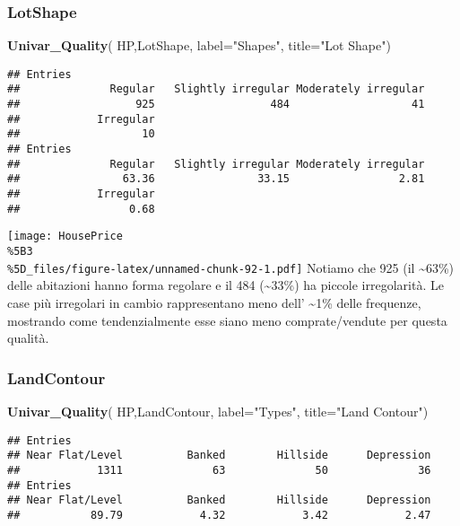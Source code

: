 \documentclass[
]{article}
\newenvironment{Shaded}{\begin{snugshade}}{\end{snugshade}}
\newcommand{\AttributeTok}[1]{\textcolor[rgb]{0.13,0.29,0.53}{#1}}
\newcommand{\FunctionTok}[1]{\textcolor[rgb]{0.13,0.29,0.53}{\textbf{#1}}}
\newcommand{\NormalTok}[1]{#1}
\newcommand{\StringTok}[1]{\textcolor[rgb]{0.31,0.60,0.02}{#1}}
\begin{document}
\subsubsection{LotShape}\label{lotshape}

\begin{Shaded}
\begin{Highlighting}[]
\FunctionTok{Univar\_Quality}\NormalTok{(}
\NormalTok{  HP,LotShape,}
  \AttributeTok{label=}\StringTok{"Shapes"}\NormalTok{,}
  \AttributeTok{title=}\StringTok{"Lot Shape"}\NormalTok{)}
\end{Highlighting}
\end{Shaded}

\begin{verbatim}
## Entries
##              Regular   Slightly irregular Moderately irregular 
##                  925                  484                   41 
##            Irregular 
##                   10 
## Entries
##              Regular   Slightly irregular Moderately irregular 
##                63.36                33.15                 2.81 
##            Irregular 
##                 0.68
\end{verbatim}

\texttt{[image: HousePrice\\\%5B3\\\%5D\_files/figure-latex/unnamed-chunk-92-1.pdf]}
Notiamo che 925 (il \textasciitilde63\%) delle abitazioni hanno forma
regolare e il 484 (\textasciitilde33\%) ha piccole irregolarità. Le case
più irregolari in cambio rappresentano meno dell' \textasciitilde1\%
delle frequenze, mostrando come tendenzialmente esse siano meno
comprate/vendute per questa qualità.

\subsubsection{LandContour}\label{landcontour}

\begin{Shaded}
\begin{Highlighting}[]
\FunctionTok{Univar\_Quality}\NormalTok{(}
\NormalTok{  HP,LandContour,}
  \AttributeTok{label=}\StringTok{"Types"}\NormalTok{,}
  \AttributeTok{title=}\StringTok{"Land Contour"}\NormalTok{)}
\end{Highlighting}
\end{Shaded}

\begin{verbatim}
## Entries
## Near Flat/Level          Banked        Hillside      Depression 
##            1311              63              50              36 
## Entries
## Near Flat/Level          Banked        Hillside      Depression 
##           89.79            4.32            3.42            2.47
\end{verbatim}
\end{document}
